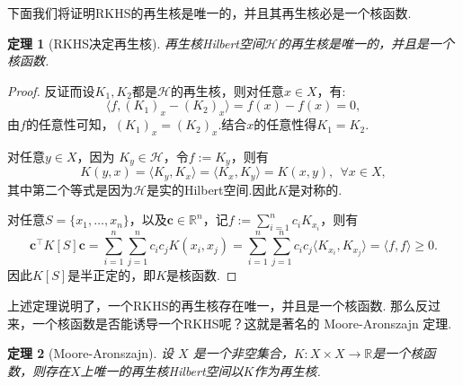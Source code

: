 \documentclass[12pt, a4paper, oneside]{ctexbook}
\newtheorem{theorem}{定理}[section]
\begin{document}
下面我们将证明RKHS的再生核是唯一的，并且其再生核必是一个核函数.
\begin{theorem}[RKHS决定再生核]
    再生核Hilbert空间$\mathcal{H}$的再生核是唯一的，并且是一个核函数.
\end{theorem}

\begin{proof}
    反证而设$K_1,K_2$都是$\mathcal{H}$的再生核，则对任意$x\in X$，有:
    \begin{equation*}
        \langle f,(K_1)_x-(K_2)_x\rangle=f(x)-f(x)=0,
    \end{equation*}
    由$f$的任意性可知，$(K_1)_x=(K_2)_x$.结合$x$的任意性得$K_1=K_2$.

    对任意$y\in X$，因为 $K_y\in\mathcal{H}$，令$f:=K_y$，则有
    \begin{equation*}
        K(y,x)=\langle K_y,K_x\rangle=\langle K_x,K_y\rangle=K(x,y),~~\forall x\in X,
    \end{equation*}
    其中第二个等式是因为$\mathcal{H}$是实的Hilbert空间.因此$K$是对称的.

    对任意$S=\{x_1,\dots,x_n\}$，以及$\boldsymbol{c}\in\mathbb{R}^n$，记$f:=\sum_{i=1}^n c_i K_{x_i}$，则有
    \begin{equation*}
        \boldsymbol{c}^\top K[S]\boldsymbol{c}=\sum_{i=1}^n\sum_{j=1}^nc_ic_jK(x_i,x_j)=\sum_{i=1}^n\sum_{j=1}^nc_ic_j\langle K_{x_i},K_{x_j}\rangle = \langle f,f\rangle\geq 0.
    \end{equation*}
    因此$K[S]$是半正定的，即$K$是核函数.
\end{proof}

上述定理说明了，一个RKHS的再生核存在唯一，并且是一个核函数. 那么反过来，一个核函数是否能诱导一个RKHS呢？这就是著名的 Moore-Aronszajn 定理.

\begin{theorem}[Moore-Aronszajn]\label{thm:Moore-Aronszajn}
    设 $X$ 是一个非空集合，$K:X\times X\to \mathbb{R}$是一个核函数，则存在$X$上唯一的再生核Hilbert空间以$K$作为再生核.
\end{theorem}
\end{document}
